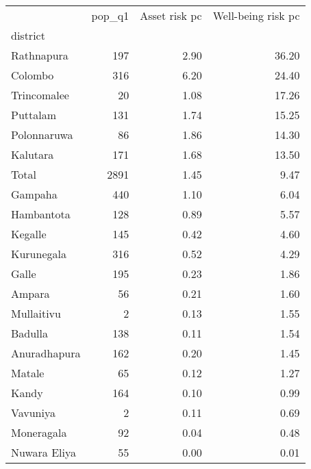 \begin{tabular}{lrrr}
\toprule
{} &  pop\_q1 &  Asset risk pc &  Well-being risk pc \\
district     &         &                &                     \\
\midrule
Rathnapura   &     197 &           2.90 &               36.20 \\
Colombo      &     316 &           6.20 &               24.40 \\
Trincomalee  &      20 &           1.08 &               17.26 \\
Puttalam     &     131 &           1.74 &               15.25 \\
Polonnaruwa  &      86 &           1.86 &               14.30 \\
Kalutara     &     171 &           1.68 &               13.50 \\
Total        &    2891 &           1.45 &                9.47 \\
Gampaha      &     440 &           1.10 &                6.04 \\
Hambantota   &     128 &           0.89 &                5.57 \\
Kegalle      &     145 &           0.42 &                4.60 \\
Kurunegala   &     316 &           0.52 &                4.29 \\
Galle        &     195 &           0.23 &                1.86 \\
Ampara       &      56 &           0.21 &                1.60 \\
Mullaitivu   &       2 &           0.13 &                1.55 \\
Badulla      &     138 &           0.11 &                1.54 \\
Anuradhapura &     162 &           0.20 &                1.45 \\
Matale       &      65 &           0.12 &                1.27 \\
Kandy        &     164 &           0.10 &                0.99 \\
Vavuniya     &       2 &           0.11 &                0.69 \\
Moneragala   &      92 &           0.04 &                0.48 \\
Nuwara Eliya &      55 &           0.00 &                0.01 \\
\bottomrule
\end{tabular}
